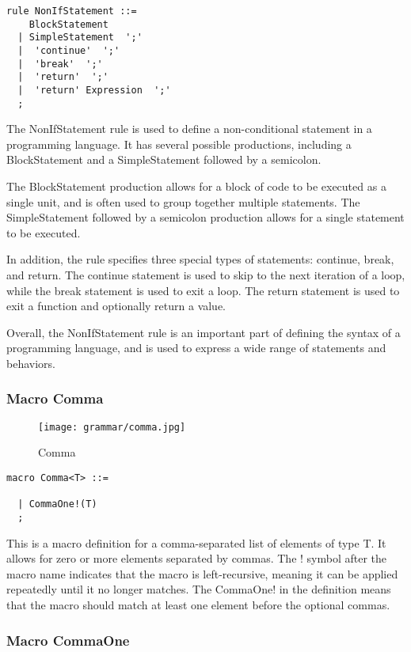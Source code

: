 \begin{lstlisting}
rule NonIfStatement ::=
    BlockStatement 
  | SimpleStatement  ';' 
  |  'continue'  ';' 
  |  'break'  ';' 
  |  'return'  ';' 
  |  'return' Expression  ';' 
  ;
\end{lstlisting}

The NonIfStatement rule is used to define a non-conditional statement in a programming language. It has several possible productions, including a BlockStatement and a SimpleStatement followed by a semicolon.

The BlockStatement production allows for a block of code to be executed as a single unit, and is often used to group together multiple statements. The SimpleStatement followed by a semicolon production allows for a single statement to be executed.

In addition, the rule specifies three special types of statements: continue, break, and return. The continue statement is used to skip to the next iteration of a loop, while the break statement is used to exit a loop. The return statement is used to exit a function and optionally return a value.

Overall, the NonIfStatement rule is an important part of defining the syntax of a programming language, and is used to express a wide range of statements and behaviors.

\subsubsection*{Macro Comma}

\begin{figure}
  \centering
  \texttt{[image: grammar/comma.jpg]}
  \caption{Comma}
  \end{figure}

\begin{lstlisting}
macro Comma<T> ::=
    
  | CommaOne!(T) 
  ;
\end{lstlisting}

This is a macro definition for a comma-separated list of elements of type T. It allows for zero or more elements separated by commas. The ! symbol after the macro name indicates that the macro is left-recursive, meaning it can be applied repeatedly until it no longer matches. The CommaOne! in the definition means that the macro should match at least one element before the optional commas.

\subsubsection*{Macro CommaOne}

